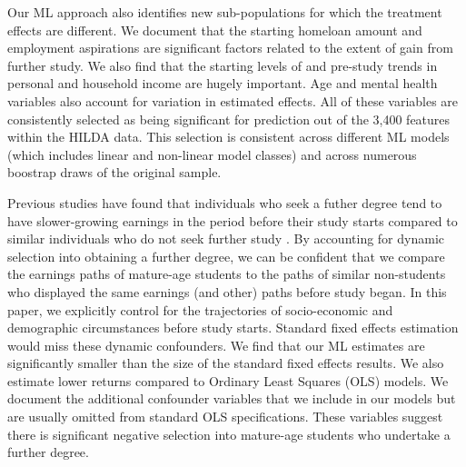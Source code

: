\documentclass[12pt, a4paper]{article}
\begin{document}
Our ML approach also identifies new sub-populations for which the treatment
effects are different. We document that the starting homeloan amount and
employment aspirations are significant factors related to the extent of gain
from further study. We also find that the starting levels of and pre-study
trends in personal and household income are hugely important. Age and mental
health variables also account for variation in estimated effects. All of these
variables are consistently selected as being significant for prediction out of
the 3,400 features within the HILDA data. This selection is consistent across
different ML models (which includes linear and non-linear model classes) and
across numerous boostrap draws of the original sample.

Previous studies have found that individuals who seek a futher degree tend to
have slower-growing earnings in the period before their study starts compared
to similar individuals who do not seek further study \citep{jacobson2005,
dynarski2016, dynarski2018}. By accounting for dynamic selection into obtaining
a further degree, we can be confident that we compare the earnings paths of
mature-age students to the paths of similar non-students who displayed the same
earnings (and other) paths before study began. In this paper, we explicitly
control for the trajectories of socio-economic and demographic circumstances
before study starts. Standard fixed effects estimation would miss these dynamic
confounders. We find that our ML estimates are significantly smaller than the
size of the standard fixed effects results. We also estimate lower returns
compared to Ordinary Least Squares (OLS) models. We document the additional
confounder variables that we include in our models but are usually omitted from
standard OLS specifications. These variables suggest there is significant
negative selection into mature-age students who undertake a further degree.

\end{document}
